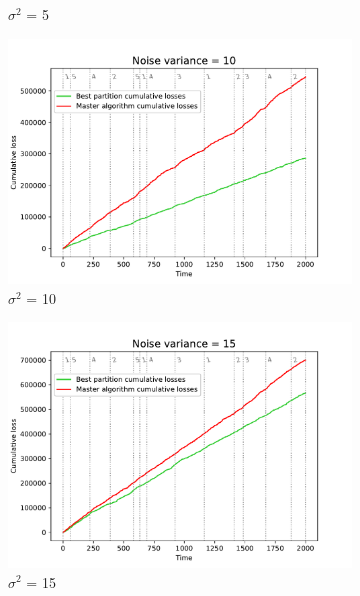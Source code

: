 \documentclass[12pt, twoside]{article}
\begin{document}
\begin{figure}[htb]
\begin{subfigure}{0.33\textwidth}
  \caption{$\sigma^2$ = 5}
  \label{fig:n_5}
\end{subfigure}

\medskip
\begin{subfigure}{0.33\textwidth}
  \includegraphics[width=\linewidth]{noise_10}
  \caption{$\sigma^2$ = 10}
  \label{fig:n_10}
\end{subfigure}\hfil %
\begin{subfigure}{0.33\textwidth}
  \includegraphics[width=\linewidth]{noise_15}
  \caption{$\sigma^2$ = 15}
  \label{fig:n_15}
\end{subfigure}\hfil %
\begin{subfigure}{0.33\textwidth}

\end{subfigure}
\end{figure}
\end{document}
